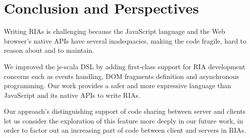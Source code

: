 \documentclass[american,english,runningheads]{llncs}
\begin{document}
\section{Conclusion and Perspectives}
\label{discussion}

Writing RIAs is challenging because the JavaScript language and the Web browser’s native APIs have several
inadequacies, making the code fragile, hard to reason about and to maintain.

We improved the js-scala DSL by adding first-class support for RIA development concerns such as events handling,
DOM fragments definition and asynchronous programming. Our work provides a safer and more expressive language than
JavaScript and its native APIs to write RIAs.

Our approach’s distinguishing support of code sharing between server and clients let us consider the exploration of
this feature more deeply in our future work, in order to factor out an increasing part of code between client and
servers in RIAs.



\end{document}
